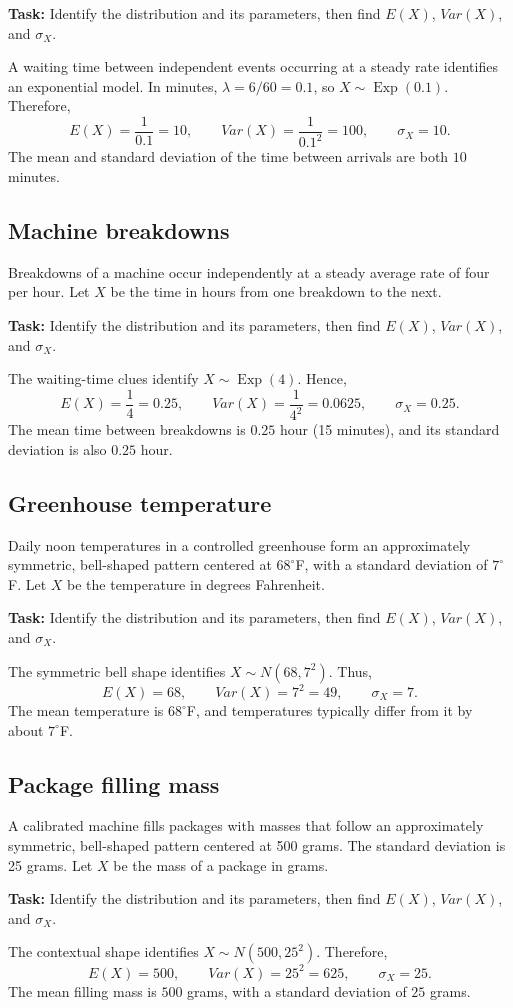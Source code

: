 \textbf{Task:} Identify the distribution and its parameters, then find
$E(X)$, $Var(X)$, and $\sigma_X$.

A waiting time between independent events occurring at a steady rate identifies
an exponential model. In minutes, $\lambda=6/60=0.1$, so
$X\sim\operatorname{Exp}(0.1)$. Therefore,
\[
E(X)=\frac1{0.1}=10,\qquad
Var(X)=\frac1{0.1^2}=100,\qquad
\sigma_X=10.
\]
The mean and standard deviation of the time between arrivals are both
$10$ minutes.

\subsection{Machine breakdowns}\label{sec:c4-context-breakdown}
Breakdowns of a machine occur independently at a steady average rate of four
per hour. Let $X$ be the time in hours from one breakdown to the next.

\textbf{Task:} Identify the distribution and its parameters, then find
$E(X)$, $Var(X)$, and $\sigma_X$.

The waiting-time clues identify $X\sim\operatorname{Exp}(4)$. Hence,
\[
E(X)=\frac14=0.25,\qquad
Var(X)=\frac1{4^2}=0.0625,\qquad
\sigma_X=0.25.
\]
The mean time between breakdowns is $0.25$ hour (15 minutes), and its standard
deviation is also $0.25$ hour.

\subsection{Greenhouse temperature}\label{sec:c4-context-temperature}
Daily noon temperatures in a controlled greenhouse form an approximately
symmetric, bell-shaped pattern centered at $68^\circ$F, with a standard
deviation of $7^\circ$F. Let $X$ be the temperature in degrees Fahrenheit.

\textbf{Task:} Identify the distribution and its parameters, then find
$E(X)$, $Var(X)$, and $\sigma_X$.

The symmetric bell shape identifies $X\sim N(68,7^2)$. Thus,
\[
E(X)=68,\qquad Var(X)=7^2=49,\qquad \sigma_X=7.
\]
The mean temperature is $68^\circ$F, and temperatures typically differ from it
by about $7^\circ$F.

\subsection{Package filling mass}\label{sec:c4-context-filling}
A calibrated machine fills packages with masses that follow an approximately
symmetric, bell-shaped pattern centered at 500 grams. The standard deviation is
25 grams. Let $X$ be the mass of a package in grams.

\textbf{Task:} Identify the distribution and its parameters, then find
$E(X)$, $Var(X)$, and $\sigma_X$.

The contextual shape identifies $X\sim N(500,25^2)$. Therefore,
\[
E(X)=500,\qquad Var(X)=25^2=625,\qquad \sigma_X=25.
\]
The mean filling mass is $500$ grams, with a standard deviation of $25$ grams.





